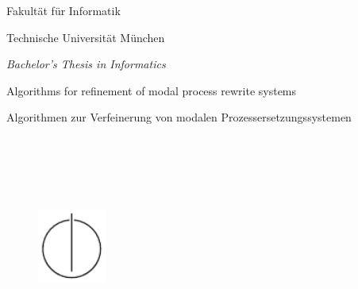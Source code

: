 \let\cleardoublepage\clearpage

\thispagestyle{empty}
\begin{titlepage}
  \begin{center}
    \begin{figure}[htp]
      \centering
      \oTUM{6cm}
    \end{figure}

    \vspace*{2\baselineskip}
    
    {\large{\scfont Fakultät für Informatik}}
    
    {\large {\scfont Technische Universität München}}
    
    \vspace{1.5cm}
    
    {\large \em Bachelor's Thesis in Informatics}

    {\huge Algorithms for refinement of modal process rewrite systems}
    
    {\huge Algorithmen zur Verfeinerung von modalen Prozessersetzungssystemen}

    \vspace{1.0cm}
    \large{
                  \\
              \\
                 \\
                    \\
    }
    
    \vspace{1.0cm}
    
    \begin{figure}[htp]
      \centering
      \includegraphics[width=0.20\textwidth]{IN_schwarz_CMYK.pdf}
    \end{figure}
  
  \end{center}
\end{titlepage}

